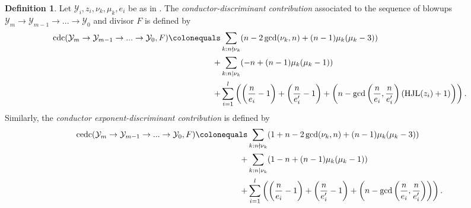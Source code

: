 \documentclass[12pt]{amsart}
\numberwithin{equation}{section}
\theoremstyle{definition}
\newtheorem{defn}[equation]{Definition}
\newcommand{\mc}[1]{\mathcal{#1}}
\newcommand{\Y}{\mathcal{Y}}
\DeclareMathOperator{\cdc}{cdc}
\DeclareMathOperator{\cedc}{cedc}
\DeclareMathOperator{\HJL}{HJL}
\begin{document}
\begin{defn}\label{dfn: cdc of sequence}
    Let $\mc{Y}_i,z_i,\nu_k,\mu_k,e_i$ be as in . The \textit{conductor-discriminant contribution} 
    associated to the sequence of blowups $\Y_m\to\Y_{m-1}\to...\to\Y_0$ and divisor $F$ is defined by
    \begin{align*}
        \cdc(\Y_m\to\Y_{m-1}\to...\to\Y_0,F)\colonequals&\sum_{ k:n\nmid\nu_k}(n-2\gcd(\nu_k,n)+(n-1)\mu_k(\mu_k-3))\\
        +&\sum_{k:n\mid\nu_k}(-n+(n-1)\mu_k(\mu_k-1))\\+&\sum_{i=1}^l\left(\left(\frac{n}{e_i}-1\right)+\left(\frac{n}{e_i'}-1\right)+\left(n-\gcd \left(\frac{n}{e_i},\frac{n}{e_i'} \right)(\HJL(z_i)+1)\right)\right).
    \end{align*}
    Similarly, the \textit{conductor exponent-discriminant contribution} 
    is defined by
    \begin{align*}
        \cedc(\Y_m\to\Y_{m-1}\to...\to\Y_0,F)\colonequals&\sum_{ k:n\nmid\nu_k}(1+n-2\gcd(\nu_k,n)+(n-1)\mu_k(\mu_k-3))\\
        +&\sum_{k:n\mid\nu_k}(1-n+(n-1)\mu_k(\mu_k-1))
        \\+&\sum_{i=1}^l\left(\left(\frac{n}{e_i}-1\right)+\left(\frac{n}{e_i'}-1\right)+\left(n-\gcd \left(\frac{n}{e_i},\frac{n}{e_i'} \right)\right)\right).
    \end{align*}



\end{defn}
\end{document}
